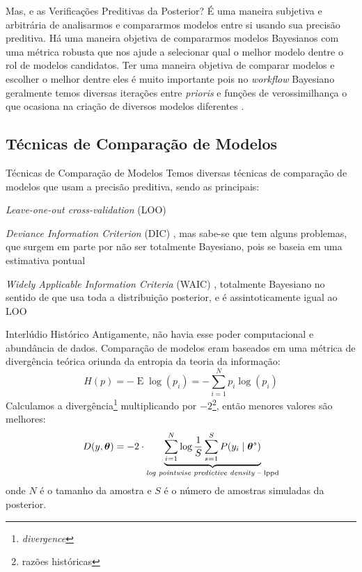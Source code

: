 \begin{frame}{Mas, e as Verificações Preditivas da Posterior?}
    É uma maneira subjetiva e arbitrária de analisarmos e compararmos modelos
    entre si usando sua precisão preditiva.
    \vfill
    Há uma maneira objetiva de compararmos modelos Bayesianos com uma
    métrica robusta que nos ajude a selecionar qual o melhor modelo dentre o rol
    de modelos candidatos.
    \vfill
    Ter uma maneira objetiva de comparar modelos e escolher o melhor dentre eles
    é muito importante pois no \textit{workflow} Bayesiano geralmente temos diversas
    iterações entre \textit{prioris} e funções de verossimilhança o que ocasiona na
    criação de diversos modelos diferentes \parencite{gelmanBayesianWorkflow2020}.
\end{frame}

\subsection{Técnicas de Comparação de Modelos}
\begin{frame}{Técnicas de Comparação de Modelos}
    Temos diversas técnicas de comparação de modelos que usam a precisão preditiva,
    sendo as principais:
    \begin{vfilleditems}
        \item \textit{Leave-one-out cross-validation} (LOO)
        \parencite{vehtariPracticalBayesianModel2015}
        \item \textit{Deviance Information Criterion} (DIC)
        \parencite{spiegelhalter2002bayesian},  mas sabe-se que tem alguns problemas,
        que surgem em parte por não ser totalmente Bayesiano,
        pois se baseia em uma estimativa pontual \parencite{van2005dic}
        \item \textit{Widely Applicable Information Criteria} (WAIC)
        \parencite{watanabe2010asymptotic}, totalmente Bayesiano no sentido
        de que usa toda a distribuição posterior, e é assintoticamente igual ao
        LOO \parencite{vehtariPracticalBayesianModel2015}
    \end{vfilleditems}
\end{frame}

\begin{frame}{Interlúdio Histórico}
    \small
    Antigamente, não havia esse poder computacional e abundância de dados.
    Comparação de modelos eram baseados em uma métrica de divergência teórica
    oriunda da entropia da teoria da informação:
    $$
    H(p) = - \operatorname{E}\log(p_i) = -\sum^N_{i=1} p_i \log(p_i)
    $$
    \small
    Calculamos a divergência\footnote{\textit{divergence}} multiplicando por
    $-2$\footnote{razões históricas},
    então menores valores são melhores:
    $$
    D(y, \boldsymbol{\theta}) = -2 \cdot \underbrace{\sum^N_{i=1} \log \frac{1}{S}\sum^S_{s=1} P(y_i \mid \boldsymbol{\theta}^s)}_{\text{\textit{log pointwise predictive density} -- lppd}}
    $$
    \footnotesize
    onde $N$ é o tamanho da amostra e $S$ é o número de amostras simuladas da posterior.
\end{frame}

